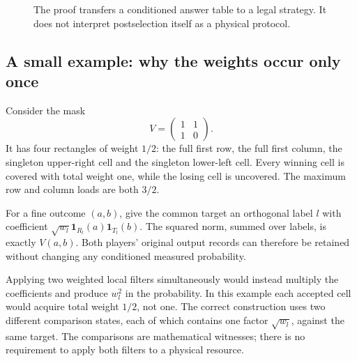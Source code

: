 \documentclass[11pt,reqno]{amsart}
\numberwithin{equation}{section}
\begin{document}
\begin{figure}[ht]
\centering
{}
\caption{The proof transfers a conditioned answer table to a legal strategy. It does not interpret postselection itself as a physical protocol.}
\end{figure}

\subsection{A small example: why the weights occur only once}\label{a-small-example-why-the-weights-occur-only-once}

Consider the mask \[
 V=\begin{pmatrix}1&1\\1&0\end{pmatrix}.
\] It has four rectangles of weight \(1/2\): the full first row, the full first column, the singleton upper-right cell and the singleton lower-left cell. Every winning cell is covered with total weight one, while the losing cell is uncovered. The maximum row and column loads are both \(3/2\).

For a fine outcome \((a,b)\), give the common target an orthogonal label \(l\) with coefficient \(\sqrt{w_l}\mathbf1_{R_l}(a)\mathbf1_{T_l}(b)\). The squared norm, summed over labels, is exactly \(V(a,b)\). Both players' original output records can therefore be retained without changing any conditioned measured probability.

Applying two weighted local filters simultaneously would instead multiply the coefficients and produce \(w_l^2\) in the probability. In this example each accepted cell would acquire total weight \(1/2\), not one. The correct construction uses two different comparison states, each of which contains one factor \(\sqrt{w_l}\), against the same target. The comparisons are mathematical witnesses; there is no requirement to apply both filters to a physical resource.
\end{document}
